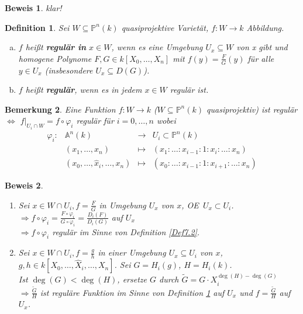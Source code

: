 \documentclass[a4paper,12pt]{report}
\theoremstyle{break}
\newtheorem{Def}{Definition}[section]
\newtheorem{Bem}[Def]{Bemerkung}
\theoremstyle{nonumberbreak}
\newtheorem{Bew}{Beweis}
\theoremstyle{nonumberplain}
\newcommand{\quot}[1]{\textrm{\glqq}{#1}\textrm{\grqq}}
\newcommand{\emp}[1]{\textbf{\emph{#1}}}
\newcommand{\begriff}[1]{{\index{#1}}\emp{#1}}
\newenvironment{twosidedproof}{\begin{enumerate}[\quot{$\Rightarrow$}:]}{\end{enumerate}}
\newcommand{\proofforward}{\item[\quot{$\Rightarrow$}:]}
\newcommand{\proofreverse}{\item[\quot{$\Leftarrow$}:]}
\newcommand{\A}{\mathbb{A}}
\newcommand{\IP}{\mathbb{P}}%
\renewcommand{\OE}{O\!\!E~}
\begin{document}
\begin{Bew}
klar!
\end{Bew}

\begin{Def}\label{Def12.2}
Sei $W\subseteq\IP^n(k)$ quasiprojektive Variet\"at, $f:W\to k$ Abbildung.\begin{enumerate}[a)]
\item
	$f$ hei\ss t \begriff{regul\"ar in} $x\in W$, wenn es eine Umgebung $U_x\subseteq W$ von x gibt und homogene Polynome $F, G \in k[X_0,\ldots ,X_n]$ mit $f(y)=\frac{F}{G}(y)$ f\"ur alle $y\in U_x$ (insbesondere $U_x\subseteq D(G)$).

\item
	$f$ hei\ss t \begriff{regul\"ar}, wenn es in jedem $x\in W$ regul\"ar ist.
\end{enumerate}\end{Def}

\begin{Bem}
Eine Funktion $f:W \to k$ ($W\subseteq\IP^n(k)$ quasiprojektiv) ist regul\"ar $\Leftrightarrow$ $f|_{U_i\cap W}=f\circ \varphi_i$ regul\"ar f\"ur $i=0,\ldots ,n$ wobei
	\[\begin{array}{lrcl}
		\varphi_i: & \A^n(k) &\to& U_i\subset \IP^n(k)\\
		& (x_1,\ldots ,x_n) & \mapsto & (x_1:\ldots :x_{i-1}:1:x_i:\ldots :x_n)\\
		& (x_0,\ldots ,\hat x_i,\ldots ,x_n) &\mapsto& (x_0:\ldots :x_{i-1}:1:x_{i+1}:\ldots :x_n)
	\end{array}\]
\end{Bem}

\begin{Bew}\begin{twosidedproof}
\proofforward
	Sei  $x\in W\cap U_i, f=\frac{F}{G}$ in Umgebung $U_x$ von $x$, \OE $U_x\subset U_i$.\\
	$\Rightarrow f\circ \varphi_i=\frac{F\circ \varphi_i}{G\circ \varphi_i}=\frac{D_i(F)}{D_i(G)}$ auf $U_x$\\
	$\Rightarrow f\circ \varphi_i$ regul\"ar im Sinne von Definition \ref{Def7.2}.
\proofreverse
	Sei $x\in W\cap U_i, f=\frac{g}{h}$ in einer Umgebung $U_x\subseteq U_i$ von $x$, $g,h\in k[X_0,\ldots ,\widehat X_i,\ldots ,X_n]$. Sei $G=H_i(g)$, $H=H_i(k)$.\\
	Ist $\deg(G)<\deg(H)$, ersetze $G$ durch $\widetilde G=G\cdot X_i^{\deg(H)-\deg(G)}$\\
	$\Rightarrow \frac{\widetilde G}{H}$ ist regul\"are Funktion im Sinne von Definition \ref{Def12.2} auf $U_x$ und $f=\frac{\widetilde G}{H}$ auf $U_x$.
\end{twosidedproof}\end{Bew}
\end{document}
